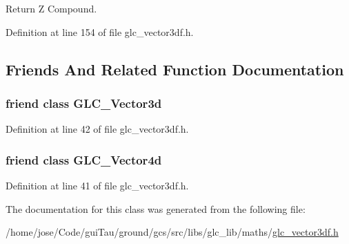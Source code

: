 Return Z Compound. 



Definition at line 154 of file glc\-\_\-vector3df.\-h.



\subsection{Friends And Related Function Documentation}
\hypertarget{class_g_l_c___vector3df_a12e30aa3c4b9461968961178e9c38b10}{
\subsubsection[{G\-L\-C\-\_\-\-Vector3d}]{\setlength{\rightskip}{0pt plus 5cm}friend class {\bf G\-L\-C\-\_\-\-Vector3d}\hspace{0.3cm}{\ttfamily [friend]}}}\label{class_g_l_c___vector3df_a12e30aa3c4b9461968961178e9c38b10}


Definition at line 42 of file glc\-\_\-vector3df.\-h.

\hypertarget{class_g_l_c___vector3df_a7f0b47b2a85e893a6b383b7242361028}{
\subsubsection[{G\-L\-C\-\_\-\-Vector4d}]{\setlength{\rightskip}{0pt plus 5cm}friend class {\bf G\-L\-C\-\_\-\-Vector4d}\hspace{0.3cm}{\ttfamily [friend]}}}\label{class_g_l_c___vector3df_a7f0b47b2a85e893a6b383b7242361028}


Definition at line 41 of file glc\-\_\-vector3df.\-h.



The documentation for this class was generated from the following file\-:\begin{DoxyCompactItemize}
\item 
/home/jose/\-Code/gui\-Tau/ground/gcs/src/libs/glc\-\_\-lib/maths/\hyperlink{glc__vector3df_8h}{glc\-\_\-vector3df.\-h}\end{DoxyCompactItemize}
